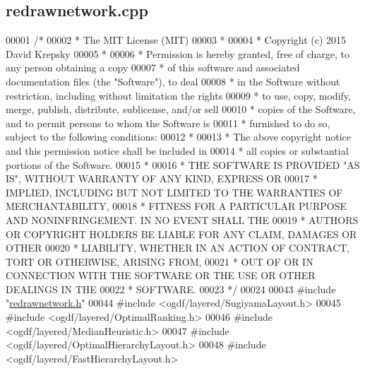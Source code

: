 \hypertarget{redrawnetwork_8cpp_source}{}\subsection{redrawnetwork.\+cpp}
\label{redrawnetwork_8cpp_source}

\begin{DoxyCode}
00001 \textcolor{comment}{/*}
00002 \textcolor{comment}{ * The MIT License (MIT)}
00003 \textcolor{comment}{ *}
00004 \textcolor{comment}{ * Copyright (c) 2015 David Krepsky}
00005 \textcolor{comment}{ *}
00006 \textcolor{comment}{ * Permission is hereby granted, free of charge, to any person obtaining a copy}
00007 \textcolor{comment}{ * of this software and associated documentation files (the "Software"), to deal}
00008 \textcolor{comment}{ * in the Software without restriction, including without limitation the rights}
00009 \textcolor{comment}{ * to use, copy, modify, merge, publish, distribute, sublicense, and/or sell}
00010 \textcolor{comment}{ * copies of the Software, and to permit persons to whom the Software is}
00011 \textcolor{comment}{ * furnished to do so, subject to the following conditions:}
00012 \textcolor{comment}{ *}
00013 \textcolor{comment}{ * The above copyright notice and this permission notice shall be included in}
00014 \textcolor{comment}{ * all copies or substantial portions of the Software.}
00015 \textcolor{comment}{ *}
00016 \textcolor{comment}{ * THE SOFTWARE IS PROVIDED "AS IS", WITHOUT WARRANTY OF ANY KIND, EXPRESS OR}
00017 \textcolor{comment}{ * IMPLIED, INCLUDING BUT NOT LIMITED TO THE WARRANTIES OF MERCHANTABILITY,}
00018 \textcolor{comment}{ * FITNESS FOR A PARTICULAR PURPOSE AND NONINFRINGEMENT. IN NO EVENT SHALL THE}
00019 \textcolor{comment}{ * AUTHORS OR COPYRIGHT HOLDERS BE LIABLE FOR ANY CLAIM, DAMAGES OR OTHER}
00020 \textcolor{comment}{ * LIABILITY, WHETHER IN AN ACTION OF CONTRACT, TORT OR OTHERWISE, ARISING FROM,}
00021 \textcolor{comment}{ * OUT OF OR IN CONNECTION WITH THE SOFTWARE OR THE USE OR OTHER DEALINGS IN THE}
00022 \textcolor{comment}{ * SOFTWARE.}
00023 \textcolor{comment}{ */}
00024 
00043 \textcolor{preprocessor}{#include "\hyperlink{redrawnetwork_8h}{redrawnetwork.h}"}
00044 \textcolor{preprocessor}{#include <ogdf/layered/SugiyamaLayout.h>}
00045 \textcolor{preprocessor}{#include <ogdf/layered/OptimalRanking.h>}
00046 \textcolor{preprocessor}{#include <ogdf/layered/MedianHeuristic.h>}
00047 \textcolor{preprocessor}{#include <ogdf/layered/OptimalHierarchyLayout.h>}
00048 \textcolor{preprocessor}{#include <ogdf/layered/FastHierarchyLayout.h>}

\end{DoxyCode}
